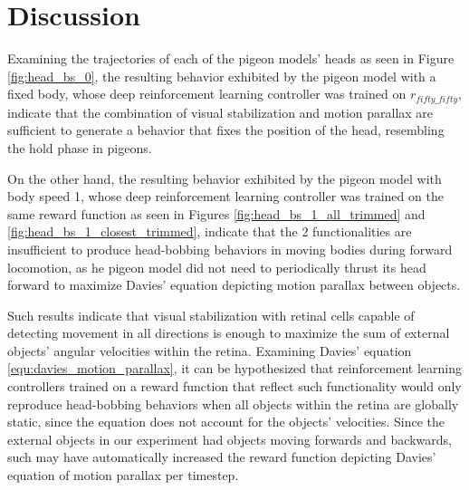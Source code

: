 \chapter{Discussion} \label{ch:discussion}
  Examining the trajectories of each of the pigeon models' heads as seen in Figure \ref{fig:head_bs_0}, the resulting behavior exhibited by the pigeon model with a fixed body, whose deep reinforcement learning controller was trained on $r_{fifty\_fifty}$, indicate that the combination of visual stabilization and motion parallax are sufficient to generate a behavior that fixes the position of the head, resembling the hold phase in pigeons.

  On the other hand, the resulting behavior exhibited by the pigeon model with body speed 1, whose deep reinforcement learning controller was trained on the same reward function as seen in Figures \ref{fig:head_bs_1_all_trimmed} and \ref{fig:head_bs_1_closest_trimmed}, indicate that the 2 functionalities are insufficient to produce head-bobbing behaviors in moving bodies during forward locomotion, as he pigeon model did not need to periodically thrust its head forward to maximize Davies' equation depicting motion parallax between objects.

  Such results indicate that visual stabilization with retinal cells capable of detecting movement in all directions is enough to maximize the sum of external objects' angular velocities within the retina.
    Examining Davies' equation \ref{equ:davies_motion_parallax}, it can be hypothesized that reinforcement learning controllers trained on a reward function that reflect such functionality would only reproduce head-bobbing behaviors when all objects within the retina are globally static, since the equation does not account for the objects' velocities.
    Since the external objects in our experiment had objects moving forwards and backwards, such may have automatically increased the reward function depicting Davies' equation of motion parallax per timestep.


